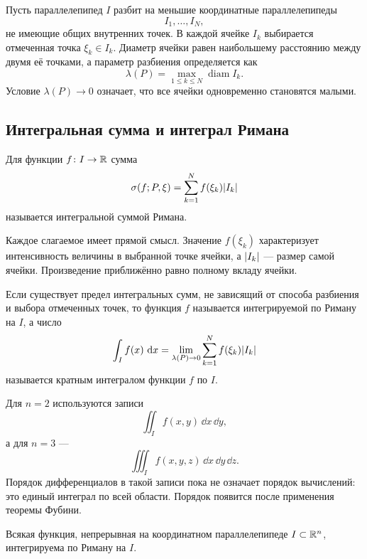 Пусть параллелепипед $I$ разбит на меньшие координатные параллелепипеды
\[
I_1,\dots,I_N,
\]
не имеющие общих внутренних точек. В каждой ячейке $I_k$ выбирается отмеченная точка $\xi_k\in I_k$. Диаметр ячейки равен наибольшему расстоянию между двумя её точками, а параметр разбиения определяется как
\[
\lambda(P)=\max_{1\leq k\leq N}\operatorname{diam}I_k.
\]
Условие $\lambda(P)\to0$ означает, что все ячейки одновременно становятся малыми.

\subsection{Интегральная сумма и интеграл Римана}

\begin{definition}
Для функции $f\colon I\to\mathbb{R}$ сумма
\begin{equation}
\sigma(f;P,\xi)
=
\sum_{k=1}^{N}f(\xi_k)\lvert I_k\rvert
\label{eq:multiple-riemann-sum}
\end{equation}
называется интегральной суммой Римана.
\end{definition}

Каждое слагаемое имеет прямой смысл. Значение $f(\xi_k)$ характеризует интенсивность величины в выбранной точке ячейки, а $\lvert I_k\rvert$ --- размер самой ячейки. Произведение приближённо равно полному вкладу ячейки.

\begin{definition}
Если существует предел интегральных сумм, не зависящий от способа разбиения и выбора отмеченных точек, то функция $f$ называется интегрируемой по Риману на $I$, а число
\begin{equation}
\int_I f(x)\,\mathop{}\!\mathrm{d} x
=
\lim_{\lambda(P)\to0}
\sum_{k=1}^{N}f(\xi_k)\lvert I_k\rvert
\label{eq:multiple-riemann-integral}
\end{equation}
называется кратным интегралом функции $f$ по $I$.
\end{definition}

Для $n=2$ используются записи
\[
\iint_I f(x,y)\,\dd x\,\dd y,
\]
а для $n=3$ ---
\[
\iiint_I f(x,y,z)\,\dd x\,\dd y\,\dd z.
\]
Порядок дифференциалов в такой записи пока не означает порядок вычислений: это единый интеграл по всей области. Порядок появится после применения теоремы Фубини.

\begin{theorem}
Всякая функция, непрерывная на координатном параллелепипеде $I\subset\mathbb{R}^n$, интегрируема по Риману на $I$.
\end{theorem}

